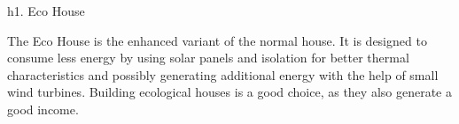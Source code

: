 h1. Eco House

The Eco House is the enhanced variant of the normal house. It is designed to consume less energy by using solar panels and isolation for better thermal characteristics and possibly generating additional energy with the help of small wind turbines. Building ecological houses is a good choice, as they also generate a good income.